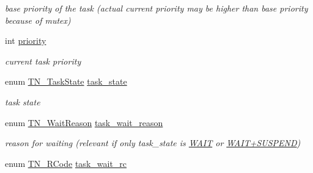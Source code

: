 \begin{DoxyCompactItemize}
\begin{DoxyCompactList}\small\item\em base priority of the task (actual current priority may be higher than base priority because of mutex) \end{DoxyCompactList}\item 
\hypertarget{structTN__Task_a43c9c73249da8faa1177587786c40616}{int \hyperlink{structTN__Task_a43c9c73249da8faa1177587786c40616}{priority}}\label{structTN__Task_a43c9c73249da8faa1177587786c40616}

\begin{DoxyCompactList}\small\item\em current task priority \end{DoxyCompactList}\item 
\hypertarget{structTN__Task_a6a1ec466a27d43d68f21a62e2c6cf03d}{enum \hyperlink{tn__tasks_8h_a5e12e8a0ab280b515f44bf3fee1210a6}{T\+N\+\_\+\+Task\+State} \hyperlink{structTN__Task_a6a1ec466a27d43d68f21a62e2c6cf03d}{task\+\_\+state}}\label{structTN__Task_a6a1ec466a27d43d68f21a62e2c6cf03d}

\begin{DoxyCompactList}\small\item\em task state \end{DoxyCompactList}\item 
\hypertarget{structTN__Task_a37d3c12db92b7dfc6c3bb661216f3c11}{enum \hyperlink{tn__tasks_8h_a343b0332013c15d6e878c2f60ed2c9b7}{T\+N\+\_\+\+Wait\+Reason} \hyperlink{structTN__Task_a37d3c12db92b7dfc6c3bb661216f3c11}{task\+\_\+wait\+\_\+reason}}\label{structTN__Task_a37d3c12db92b7dfc6c3bb661216f3c11}

\begin{DoxyCompactList}\small\item\em reason for waiting (relevant if only {\ttfamily task\+\_\+state} is \hyperlink{tn__tasks_8h_a5e12e8a0ab280b515f44bf3fee1210a6aaa3dfaf2bb5992e0cef981618ce30d56}{{\ttfamily W\+A\+I\+T}} or \hyperlink{tn__tasks_8h_a5e12e8a0ab280b515f44bf3fee1210a6ad010070ccc16a5c706c286baf2e3ee2a}{{\ttfamily W\+A\+I\+T+\+S\+U\+S\+P\+E\+N\+D}}) \end{DoxyCompactList}\item 
\hypertarget{structTN__Task_a367b92b74248f8702ed428a695079903}{enum \hyperlink{tn__common_8h_aa43bd3da1ad4c1e61224b5f23b369876}{T\+N\+\_\+\+R\+Code} \hyperlink{structTN__Task_a367b92b74248f8702ed428a695079903}{task\+\_\+wait\+\_\+rc}}\label{structTN__Task_a367b92b74248f8702ed428a695079903}


\end{DoxyCompactItemize}
